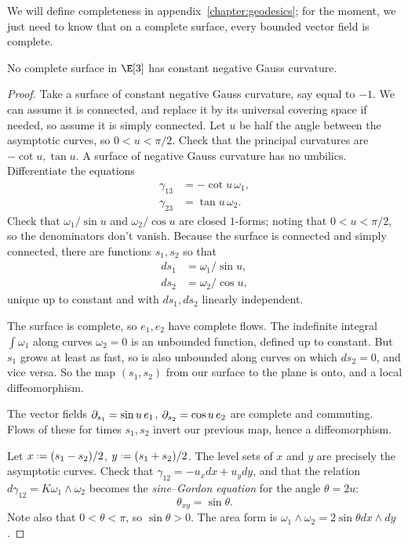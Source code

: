 We will define completeness in appendix~\ref{chapter:geodesics}; for the moment, we just need to know that on a complete surface, every bounded vector field is complete. 
\begin{theorem}[Hilbert]
No complete surface in \(\E[3]\) has constant negative Gauss curvature.
\end{theorem}
\begin{proof}
Take a surface of constant negative Gauss curvature, say equal to \(-1\).
We can assume it is connected, and replace it by its universal covering space if needed, so assume it is simply connected.
Let \(u\) be half the angle between the asymptotic curves, so \(0<u<\pi/2\).
Check that the principal curvatures are \(-\cot u,\tan u\).
A surface of negative Gauss curvature has no umbilics.
Differentiate the equations 
\begin{align*}
\gamma_{13}&=-\cot u \, \omega_1,\\
\gamma_{23}&=\tan u \, \omega_2.
\end{align*}
Check that \(\omega_1/\sin u\) and \(\omega_2/\cos u\) are closed \(1\)-forms; noting that \(0 < u < \pi/2\), so the denominators don't vanish.
Because the surface is connected and simply connected, there are functions \(s_1,s_2\) so that 
\begin{align*}
ds_1&=\omega_1/\sin u,\\
ds_2&=\omega_2/\cos u,
\end{align*}
unique up to constant and with \(ds_1,ds_2\) linearly independent.

The surface is complete, so \(e_1,e_2\) have complete flows.
The indefinite integral \(\int \omega_1\) along curves \(\omega_2=0\) is an unbounded function, defined up to constant.
But \(s_1\) grows at least as fast, so is also unbounded along curves on which \(ds_2=0\), and vice versa.
So the map \((s_1,s_2)\) from our surface to the plane is onto, and a local diffeomorphism.

The vector fields \(\partial_{s_1}=\sin u \, e_1\), \(\partial_{s_2}=\cos u \, e_2\) are complete and commuting.
Flows of these for times \(s_1,s_2\) invert our previous map, hence a diffeomorphism.

Let \(x\defeq(s_1-s_2)/2\), \(y\defeq(s_1+s_2)/2\).
The level sets of \(x\) and \(y\) are precisely the asymptotic curves.
Check that \(\gamma_{12}=-u_xdx+u_ydy\), and that the relation \(d\gamma_{12}=K\omega_1\wedge\omega_2\) becomes the \emph{sine--Gordon equation} for the angle \(\theta=2u\):
\[
\theta_{xy}=\sin\theta.
\]
Note also that \(0<\theta<\pi\), so \(\sin\theta>0\).
The area form is \(\omega_1\wedge\omega_2=2\sin \theta dx \wedge dy\).


\end{proof}
